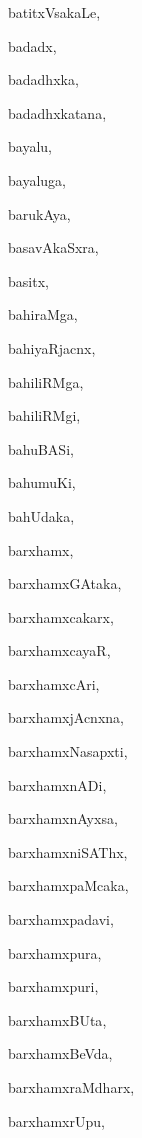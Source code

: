 \begin{multicols}{2}
{batitxVsakaLe}, \pageref{batitxVsakaLe}

{badadx}, \pageref{badadx}

{badadhxka}, \pageref{badadhxka}

{badadhxkatana}, \pageref{badadhxkatana}

{bayalu}, \pageref{bayalu}

{bayaluga}, \pageref{bayaluga}

{barukAya}, \pageref{barukAya}

{basavAkaSxra}, \pageref{basavAkaSxra}

{basitx}, \pageref{basitx}

{bahiraMga}, \pageref{bahiraMga}

{bahiyaRjacnx}, \pageref{bahiyaRjacnx}

{bahiliRMga}, \pageref{bahiliRMga}

{bahiliRMgi}, \pageref{bahiliRMgi}

{bahuBASi}, \pageref{bahuBASi}

{bahumuKi}, \pageref{bahumuKi}

{bahUdaka}, \pageref{bahUdaka}

{barxhamx}, \pageref{barxhamx}

{barxhamxGAtaka}, \pageref{barxhamxGAtaka}

{barxhamxcakarx}, \pageref{barxhamxcakarx}

{barxhamxcayaR}, \pageref{barxhamxcayaR}

{barxhamxcAri}, \pageref{barxhamxcAri}

{barxhamxjAcnxna}, \pageref{barxhamxjAcnxna}

{barxhamxNasapxti}, \pageref{barxhamxNasapxti}

{barxhamxnADi}, \pageref{barxhamxnADi}

{barxhamxnAyxsa}, \pageref{barxhamxnAyxsa}

{barxhamxniSAThx}, \pageref{barxhamxniSAThx}

{barxhamxpaMcaka}, \pageref{barxhamxpaMcaka}

{barxhamxpadavi}, \pageref{barxhamxpadavi}

{barxhamxpura}, \pageref{barxhamxpura}

{barxhamxpuri}, \pageref{barxhamxpuri}

{barxhamxBUta}, \pageref{barxhamxBUta}

{barxhamxBeVda}, \pageref{barxhamxBeVda}

{barxhamxraMdharx}, \pageref{barxhamxraMdharx}

{barxhamxrUpu}, \pageref{barxhamxrUpu}


\end{multicols}
